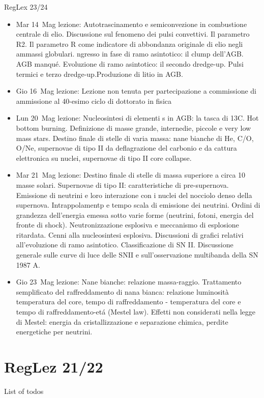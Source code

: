 \begin{frame}[allowframebreaks]{RegLex 23/24}
\begin{itemize}
\item Mar 14 Mag lezione: Autotrascinamento e semiconvezione in combustione centrale di elio. Discussione sul fenomeno dei pulsi convettivi. Il parametro R2. Il parametro R come indicatore di abbondanza originale di elio negli ammassi globulari. ngresso in fase di ramo asintotico: il clump dell'AGB. AGB manqu\'e. Evoluzione di ramo asintotico: il secondo dredge-up. Pulsi termici e terzo dredge-up.Produzione di litio in AGB. 
\item Gio 16 Mag lezione: Lezione non tenuta per partecipazione a commissione di ammissione al 40-esimo ciclo di dottorato in fisica 
\item Lun 20 Mag lezione: Nucleosintesi di elementi s in AGB: la tasca di 13C. Hot bottom burning. Definizione di masse grande, internedie, piccole e very low mass stars. Destino finale di stelle di varia massa: nane bianche di He, C/O, O/Ne, supernovae di tipo II da deflagrazione del carbonio e da cattura elettronica su nuclei, supernovae di tipo II core collapse. 
\item Mar 21 Mag lezione: Destino finale di stelle di massa superiore a circa 10 masse solari. Supernovae di tipo II: caratteristiche di pre-supernova. Emissione di neutrini e loro interazione con i nuclei del nocciolo denso della supernova. Intrappolamentp e tempo scala di emissione dei neutrini. Ordini di grandezza dell'energia emessa sotto varie forme (neutrini, fotoni, energia del fronte di shock). Neutronizzazione esplosiva e meccanismo di esplosione ritardata. Cenni alla nucleosintesi esplosiva. Discussioni di grafici relativi all'evoluzione di ramo asintotico. Classificazione di SN II. Discussione generale sulle curve di luce delle SNII e sull'osservazione multibanda della SN 1987 A. 
\item Gio 23 Mag lezione: Nane bianche: relazione massa-raggio. Trattamento semplificato del raffreddamento di nana bianca: relazione luminosità temperatura del core, tempo di raffreddamento - temperatura del core e tempo di raffreddamento-et\'a (Mestel law). Effetti non considerati nella legge di Mestel: energia da cristallizzazione e separazione chimica, perdite energetiche per neutrini. 
\end{itemize}
\end{frame}
\section{RegLez 21/22}

\begin{frame}[allowframebreaks]{List of todos}
\end{frame}

